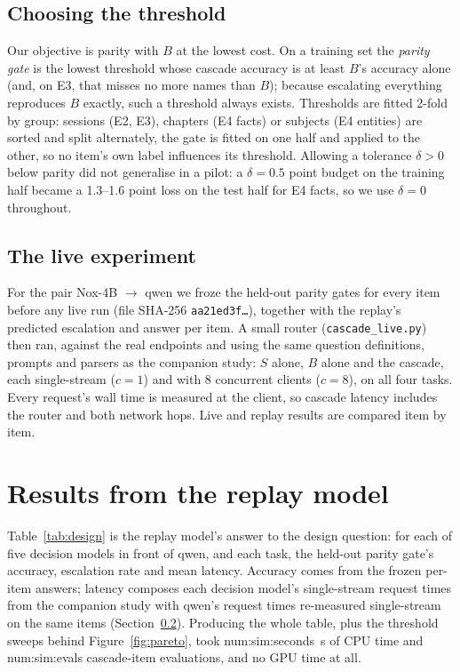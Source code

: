 \documentclass[11pt]{article}
\newcommand{\N}[1]{\csname num:#1\endcsname}
\begin{document}
\subsection{Choosing the threshold}
\label{sec:gate}
Our objective is parity with $B$ at the lowest cost. On a training set the \emph{parity gate} is the
lowest threshold whose cascade accuracy is at least $B$'s accuracy alone (and, on E3, that misses
no more names than $B$); because escalating everything reproduces $B$ exactly, such a threshold
always exists. Thresholds are fitted 2-fold by group: sessions (E2, E3), chapters (E4 facts) or
subjects (E4 entities) are sorted and split alternately, the gate is fitted on one half and applied
to the other, so no item's own label influences its threshold. Allowing a tolerance $\delta>0$
below parity did not generalise in a pilot: a $\delta = 0.5$ point budget on the training half
became a 1.3--1.6 point loss on the test half for E4 facts, so we use $\delta = 0$ throughout.

\subsection{The live experiment}
\label{sec:live}
For the pair Nox-4B $\rightarrow$ qwen we froze the held-out parity gates for every item before any
live run (file SHA-256 \texttt{aa21ed3f\ldots}), together with the replay's predicted escalation
and answer per item. A small router (\texttt{cascade\_live.py}) then ran, against the real endpoints
and using the same question definitions, prompts and parsers as the companion study:
$S$ alone, $B$ alone and the cascade, each single-stream ($c = 1$) and with 8 concurrent clients
($c = 8$), on all four tasks. Every request's wall time is measured at the client, so cascade
latency includes the router and both network hops. Live and replay results are compared item by
item.

\section{Results from the replay model}
\label{sec:sim}

Table~\ref{tab:design} is the replay model's answer to the design question: for each of five
decision models in front of qwen, and each task, the held-out parity gate's accuracy, escalation
rate and mean latency. Accuracy comes from the frozen per-item answers; latency composes each
decision model's single-stream request times from the companion study with qwen's request times
re-measured single-stream on the same items (Section~\ref{sec:live}). Producing the whole table,
plus the threshold sweeps behind Figure~\ref{fig:pareto}, took \N{sim:seconds}~s of CPU time and
\N{sim:evals} cascade-item evaluations, and no GPU time at all.
\end{document}
